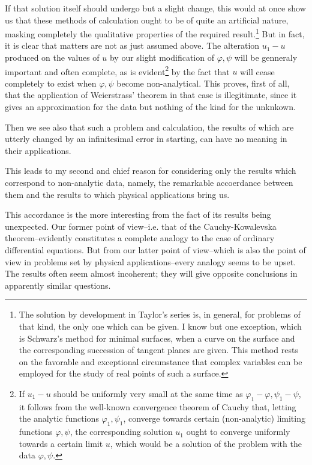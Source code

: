 \documentclass[12pt,oneside]{book}
\begin{document}
If that solution itself should undergo but a slight change, this would at once show us that these methods of calculation ought to be of quite an artificial nature, masking completely the qualitative properties of the required result.\footnote{The solution by development in Taylor's series is, in general, for problems of that kind, the only one which can be given. I know but one exception, which is Schwarz's method for minimal surfaces, when a curve on the surface and the corresponding succession of tangent planes are given. This method rests on the favorable and exceptional circumstance that complex variables can be employed for the study of real points of such a surface.} But in fact, it is clear that matters are not as just assumed above. The alteration $u_1-u$ produced on the values of $u$ by our slight modification of $\varphi,\psi$ will be genneraly important and often complete, as is evident\footnote{If $u_1-u$ should be uniformly very small at the same time as $\varphi_1-\varphi,\psi_1-\psi$, it follows from the well-known convergence theorem of Cauchy that, letting the analytic functions $\varphi_1,\psi_1$, converge towards certain (non-analytic) limiting functions $\varphi,\psi$, the corresponding solution $u_1$ ought to converge uniformly towards a certain limit $u$, which would be a solution of the problem with the data $\varphi,\psi$.} by the fact that $u$ will cease completely to exist when $\varphi,\psi$ become non-analytical. This proves, first of all, that the application of Weierstrass' theorem in that case is illegitimate, since it gives an approximation for the data but nothing of the kind for the unknkown. \par

Then we see also that such a problem and calculation, the results of which are utterly changed by an infinitesimal error in starting, can have no meaning in their applications. \par

This leads to my second and chief reason for considering only the results which correspond to non-analytic data, namely, the remarkable accoerdance between them and the results to which physical applications bring us. \par

This accordance is the more interesting from the fact of its results being unexpected. Our former point of view--i.e. that of the Cauchy-Kowalevska theorem--evidently constitutes a complete analogy to the case of ordinary differential equations. But from our latter point of view--which is also the point of view in problems set by physical applications--every analogy seems to be upset. The results often seem almost incoherent; they will give opposite conclusions in apparently similar questions. \par
\end{document}
